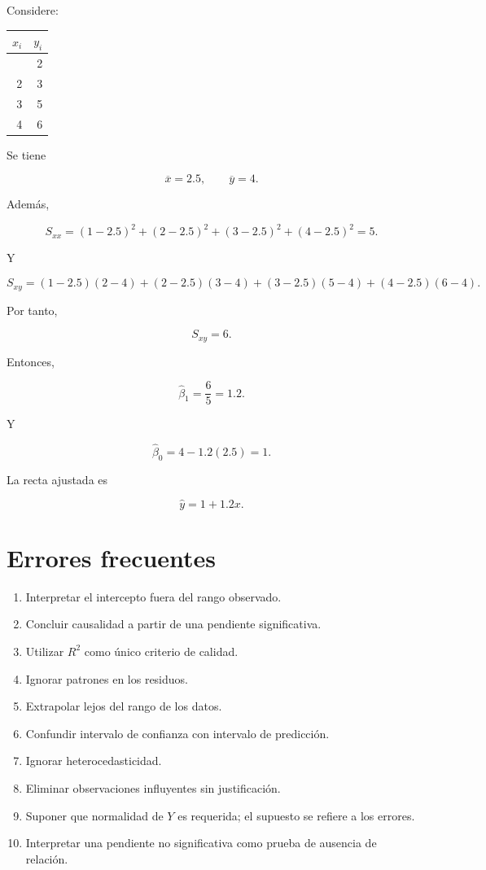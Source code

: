 \documentclass[
  spanish,
  11pt,
  letterpaper,
  DIV=11,
  numbers=noendperiod]{scrreprt}
\newcounter{none} %
\providecommand{\tightlist}{%
  \setlength{\itemsep}{0pt}\setlength{\parskip}{0pt}}
\theoremstyle{definition}
\theoremstyle{plain}
\theoremstyle{definition}
\theoremstyle{remark}
\begin{document}
Considere:

{\def\LTcaptype{none} %
\begin{longtable}[]{@{}rr@{}}
\toprule\noalign{}
\(x_i\) & \(y_i\) \\
\midrule\noalign{}
\endhead
\bottomrule\noalign{}
\endlastfoot
1 & 2 \\
2 & 3 \\
3 & 5 \\
4 & 6 \\
\end{longtable}
}

Se tiene

\[
\overline{x}=2.5,
\qquad
\overline{y}=4.
\]

Además,

\[
S_{xx}
=
(1-2.5)^2+(2-2.5)^2+(3-2.5)^2+(4-2.5)^2
=
5.
\]

Y

\[
S_{xy}
=
(1-2.5)(2-4)
+
(2-2.5)(3-4)
+
(3-2.5)(5-4)
+
(4-2.5)(6-4).
\]

Por tanto,

\[
S_{xy}=6.
\]

Entonces,

\[
\widehat{\beta}_1
=
\frac{6}{5}
=
1.2.
\]

Y

\[
\widehat{\beta}_0
=
4
-
1.2(2.5)
=
1.
\]

La recta ajustada es

\[
\widehat{y}
=
1+1.2x.
\]

\section{Errores frecuentes}\label{errores-frecuentes-8}

\begin{enumerate}
\def\labelenumi{\arabic{enumi}.}
\tightlist
\item
  Interpretar el intercepto fuera del rango observado.
\item
  Concluir causalidad a partir de una pendiente significativa.
\item
  Utilizar \(R^2\) como único criterio de calidad.
\item
  Ignorar patrones en los residuos.
\item
  Extrapolar lejos del rango de los datos.
\item
  Confundir intervalo de confianza con intervalo de predicción.
\item
  Ignorar heterocedasticidad.
\item
  Eliminar observaciones influyentes sin justificación.
\item
  Suponer que normalidad de \(Y\) es requerida; el supuesto se refiere a
  los errores.
\item
  Interpretar una pendiente no significativa como prueba de ausencia de
  relación.
\end{enumerate}
\end{document}
